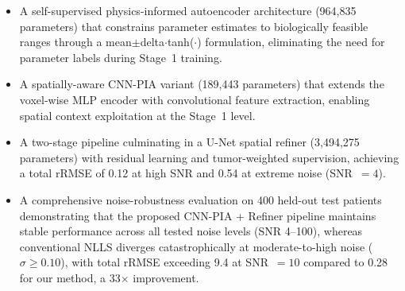 \documentclass[12pt]{article}
\begin{document}
\begin{itemize}
    \item A self-supervised physics-informed autoencoder architecture (964,835 parameters) that constrains parameter estimates to biologically feasible ranges through a mean$\pm$delta$\cdot$tanh($\cdot$) formulation, eliminating the need for parameter labels during Stage~1 training.

    \item A spatially-aware CNN-PIA variant (189,443 parameters) that extends the voxel-wise MLP encoder with convolutional feature extraction, enabling spatial context exploitation at the Stage~1 level.

    \item A two-stage pipeline culminating in a U-Net spatial refiner (3,494,275 parameters) with residual learning and tumor-weighted supervision, achieving a total rRMSE of 0.12 at high SNR and 0.54 at extreme noise (SNR~$= 4$).

    \item A comprehensive noise-robustness evaluation on 400 held-out test patients demonstrating that the proposed CNN-PIA + Refiner pipeline maintains stable performance across all tested noise levels (SNR 4--100), whereas conventional NLLS diverges catastrophically at moderate-to-high noise ($\sigma \geq 0.10$), with total rRMSE exceeding 9.4 at SNR~$= 10$ compared to 0.28 for our method, a 33$\times$ improvement.
\end{itemize}
\end{document}
